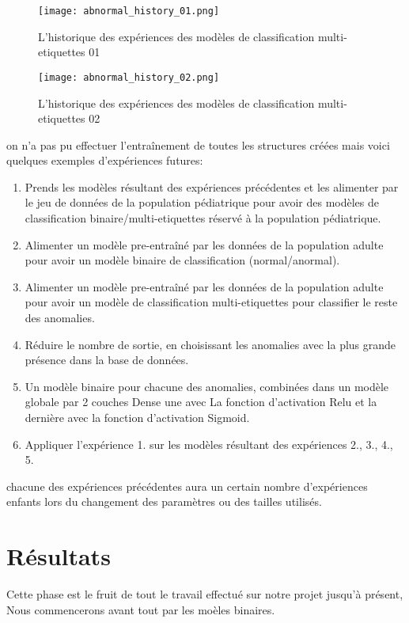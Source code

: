 \begin{figure}[H]
    \centering
    \texttt{[image: abnormal\_history\_01.png]}
    \caption{L’historique des expériences des modèles de classification multi-etiquettes 01}\label{fig:abnormal_history_01}
\end{figure}
\begin{figure}[H]
    \centering
    \texttt{[image: abnormal\_history\_02.png]}
    \caption{L’historique des expériences des modèles de classification multi-etiquettes 02}\label{fig:abnormal_history_02}
\end{figure}

on n'a pas pu effectuer l'entraînement de toutes les structures créées mais voici quelques exemples d'expériences futures:
\begin{enumerate}
    \item Prends les modèles résultant des expériences précédentes et les alimenter par le jeu de données de la population pédiatrique pour avoir des modèles de classification binaire/multi-etiquettes réservé à la population pédiatrique.
    \item Alimenter un modèle pre-entraîné par les données de la population adulte pour avoir un modèle binaire de classification (normal/anormal).
    \item Alimenter un modèle pre-entraîné par les données de la population adulte pour avoir un modèle de classification multi-etiquettes pour classifier le reste des anomalies.
    \item Réduire le nombre de sortie, en choisissant les anomalies avec la plus grande présence dans la base de données.
    \item Un modèle binaire pour chacune des anomalies, combinées dans un modèle globale par 2 couches Dense une avec La fonction d'activation Relu et la dernière avec la fonction d'activation Sigmoid.
    \item Appliquer l'expérience 1. sur les modèles résultant des expériences 2., 3., 4., 5.
\end{enumerate}

chacune des expériences précédentes aura un certain nombre d'expériences enfants lors du changement des paramètres ou des tailles utilisés.



\section{Résultats}
Cette phase est le fruit de tout le travail effectué sur notre projet jusqu'à présent, Nous commencerons avant tout par les moèles binaires.
